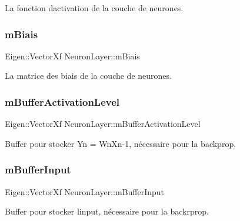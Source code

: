La fonction d\textquotesingle{}activation de la couche de neurones. 

\mbox{\label{classNeuronLayer_a6d1c0d70051d87dace0cdf654d866a4a}} 
\subsubsection{\texorpdfstring{m\+Biais}{mBiais}}
{\footnotesize\ttfamily Eigen\+::\+Vector\+Xf Neuron\+Layer\+::m\+Biais\hspace{0.3cm}{\ttfamily [private]}}



La matrice des biais de la couche de neurones. 

\mbox{\label{classNeuronLayer_a5b5ccadbab1d38fd3b09fcab7dc01148}} 
\subsubsection{\texorpdfstring{m\+Buffer\+Activation\+Level}{mBufferActivationLevel}}
{\footnotesize\ttfamily Eigen\+::\+Vector\+Xf Neuron\+Layer\+::m\+Buffer\+Activation\+Level\hspace{0.3cm}{\ttfamily [private]}}



Buffer pour stocker Yn = Wn\+Xn-\/1, nécessaire pour la backprop. 

\mbox{\label{classNeuronLayer_ab5a3fc010c33628e37b5a19d370978e9}} 
\subsubsection{\texorpdfstring{m\+Buffer\+Input}{mBufferInput}}
{\footnotesize\ttfamily Eigen\+::\+Vector\+Xf Neuron\+Layer\+::m\+Buffer\+Input\hspace{0.3cm}{\ttfamily [private]}}



Buffer pour stocker l\textquotesingle{}input, nécessaire pour la backrprop. 


